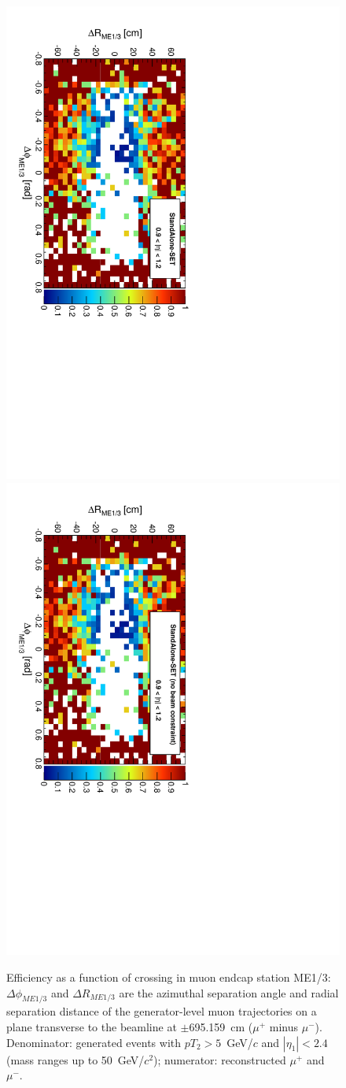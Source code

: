 \documentclass[12pt]{article}
\begin{document}
\begin{figure}[p]
\includegraphics[height=0.5\linewidth, angle=90]{fig/acceptance7_plot/me13_StandAloneUpdatedSET.pdf}
\includegraphics[height=0.5\linewidth, angle=90]{fig/acceptance7_plot/me13_StandAloneSET.pdf}

\caption{Efficiency as a function of crossing in muon endcap station
  ME1/3: $\Delta\phi_{ME1/3}$ and $\Delta R_{ME1/3}$ are the azimuthal
  separation angle and radial separation distance of the
  generator-level muon trajectories on a plane transverse to the
  beamline at $\pm$695.159~cm ($\mu^+$ minus $\mu^-$).  Denominator:
  generated events with $pT_2 > 5$~GeV/$c$ and $|\eta_1| < 2.4$ (mass
  ranges up to 50~GeV/$c^2$); numerator: reconstructed $\mu^+$ and
  $\mu^-$. \label{fig:me13}}
\end{figure}
\end{document}
